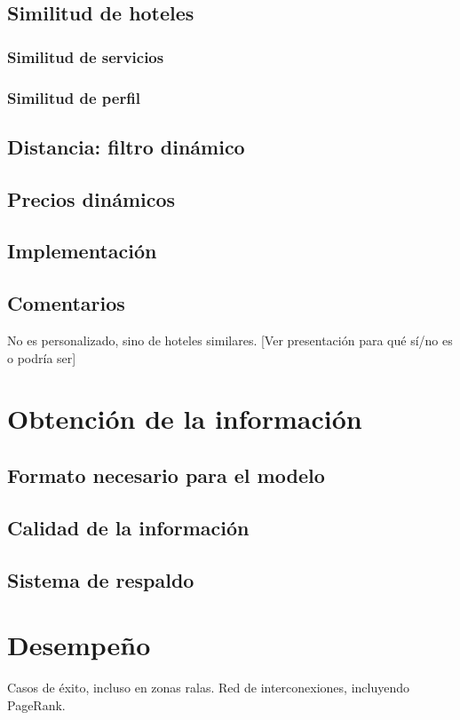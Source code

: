 \documentclass[12pt]{report}
\begin{document}
\section{Similitud de hoteles}
\subsection*{Similitud de servicios}
\subsection*{Similitud de perfil}
\section{Distancia: filtro dinámico}
\section{Precios dinámicos}
\section{Implementación}
\section{Comentarios}
No es personalizado, sino de hoteles similares.
[Ver presentación para qué sí/no es o podría ser]

\chapter{Obtención de la información}
\section{Formato necesario para el modelo}
\section{Calidad de la información}
\section{Sistema de respaldo}

\chapter{Desempeño}
Casos de éxito, incluso en zonas ralas.
Red de interconexiones, incluyendo PageRank.
\end{document}
